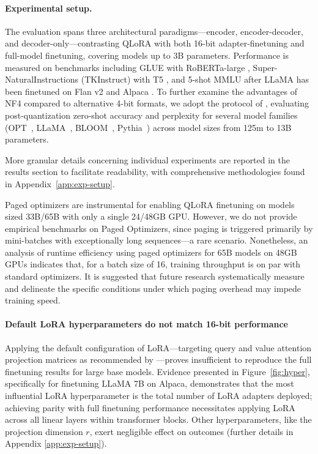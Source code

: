 \paragraph{Experimental setup.} The evaluation spans three architectural paradigms—encoder, encoder-decoder, and decoder-only—contrasting QLoRA with both 16-bit adapter-finetuning and full-model finetuning, covering models up to 3B parameters. Performance is measured on benchmarks including GLUE \citep{wang2018glue} with RoBERTa-large \citep{liu2019roberta}, Super-NaturalInstructions (TKInstruct) \citep{wang2022super} with T5 \citep{t5}, and 5-shot MMLU \citep{hendrycksmeasuring} after LLaMA has been finetuned on Flan v2 \citep{longpre2023flan} and Alpaca \citep{alpaca}. To further examine the advantages of NF4 compared to alternative 4-bit formats, we adopt the protocol of \citet{dettmers2022case}, evaluating post-quantization zero-shot accuracy and perplexity for several model families (OPT~\citep{zhang2022opt}, LLaMA~\citep{touvron2023llama}, BLOOM~\citep{scao2022bloom}, Pythia~\citep{biderman2023pythia}) across model sizes from 125m to 13B parameters.

More granular details concerning individual experiments are reported in the results section to facilitate readability, with comprehensive methodologies found in Appendix~\ref{app:exp-setup}.

Paged optimizers are instrumental for enabling \textsc{QLoRA} finetuning on models sized 33B/65B with only a single 24/48GB GPU. However, we do not provide empirical benchmarks on Paged Optimizers, since paging is triggered primarily by mini-batches with exceptionally long sequences—a rare scenario. Nonetheless, an analysis of runtime efficiency using paged optimizers for 65B models on 48GB GPUs indicates that, for a batch size of 16, training throughput is on par with standard optimizers. It is suggested that future research systematically measure and delineate the specific conditions under which paging overhead may impede training speed.

\paragraph{Default LoRA hyperparameters do not match 16-bit performance}

Applying the default configuration of LoRA—targeting query and value attention projection matrices as recommended by \citep{hu2021lora}—proves insufficient to reproduce the full finetuning results for large base models. Evidence presented in Figure~\ref{fig:hyper}, specifically for finetuning LLaMA 7B on Alpaca, demonstrates that the most influential LoRA hyperparameter is the total number of LoRA adapters deployed; achieving parity with full finetuning performance necessitates applying LoRA across all linear layers within transformer blocks. Other hyperparameters, like the projection dimension $r$, exert negligible effect on outcomes (further details in Appendix \ref{app:exp-setup}).

